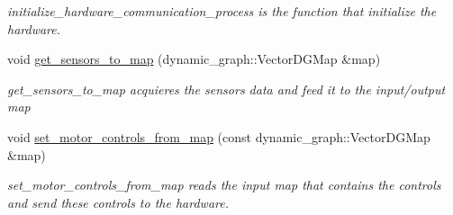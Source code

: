 \begin{DoxyCompactItemize}
\begin{DoxyCompactList}\small\item\em initialize\+\_\+hardware\+\_\+communication\+\_\+process is the function that initialize the hardware. \end{DoxyCompactList}\item 
void \hyperlink{classdg__blmc__robots_1_1DGMQuadrupedSimu_a6804388dddf35aa3980ec87c44606a14}{get\+\_\+sensors\+\_\+to\+\_\+map} (dynamic\+\_\+graph\+::\+Vector\+D\+G\+Map \&map)
\begin{DoxyCompactList}\small\item\em get\+\_\+sensors\+\_\+to\+\_\+map acquieres the sensors data and feed it to the input/output map \end{DoxyCompactList}\item 
void \hyperlink{classdg__blmc__robots_1_1DGMQuadrupedSimu_a431bbaae92470e69562c2749e35a75c8}{set\+\_\+motor\+\_\+controls\+\_\+from\+\_\+map} (const dynamic\+\_\+graph\+::\+Vector\+D\+G\+Map \&map)
\begin{DoxyCompactList}\small\item\em set\+\_\+motor\+\_\+controls\+\_\+from\+\_\+map reads the input map that contains the controls and send these controls to the hardware. \end{DoxyCompactList}\end{DoxyCompactItemize}
